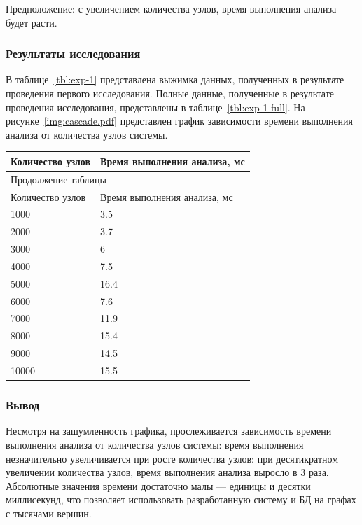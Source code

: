 Предположение: с увеличением количества узлов, время выполнения анализа будет расти.

\subsubsection{Результаты исследования}
В таблице~\ref{tbl:exp-1} представлена выжимка данных, полученных в результате проведения первого исследования.
Полные данные, полученные в результате проведения исследования, представлены в таблице~\ref{tbl:exp-1-full}. 
На рисунке~\ref{img:cascade.pdf} представлен график зависимости времени выполнения анализа
от количества узлов системы.
\begin{center}
    \begin{tabularx}{\textwidth}{|X|X|}
        \caption{\label{tbl:exp-1}Результаты проведения первого исследования} \\
        \hline
        Количество узлов & Время выполнения анализа, мс \\ \hline
        \endfirsthead

        \multicolumn{2}{l}{{Продолжение таблицы\ \thetable{}}} \\ \hline
        Количество узлов & Время выполнения анализа, мс \\ \hline
        \endhead

        \hline
        \endfoot

        \hline
        \endlastfoot

        1000 & 3.5 \\ \hline
        2000 & 3.7 \\ \hline
        3000 & 6 \\ \hline
        4000 & 7.5 \\ \hline
        5000 & 16.4 \\ \hline
        6000 & 7.6 \\ \hline
        7000 & 11.9 \\ \hline
        8000 & 15.4 \\ \hline
        9000 & 14.5 \\ \hline
        10000 & 15.5 \\ \hline
    \end{tabularx}
\end{center}

\subsubsection{Вывод}
Несмотря на зашумленность графика, прослеживается зависимость времени выполнения
анализа от количества узлов системы: время выполнения незначительно увеличивается при росте
количества узлов: при десятикратном увеличении количества узлов, время выполнения анализа
выросло в 3 раза. Абсолютные значения времени достаточно малы ---
единицы и десятки миллисекунд, что позволяет использовать разработанную систему и БД
на графах с тысячами вершин. 


